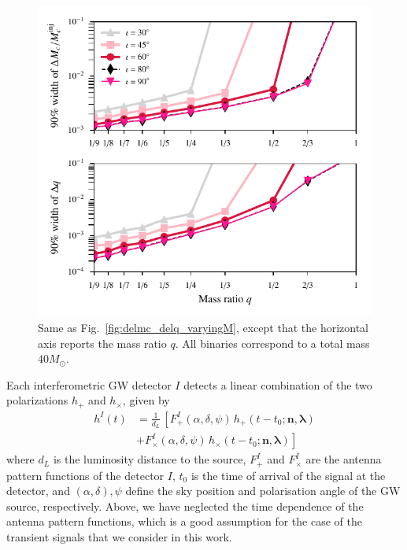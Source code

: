 \documentclass[prd,preprintnumbers,twocolumn,eqsecnum,floatfix,a4paper,nofootinbib,superscriptaddress]{revtex4}
\newcommand{\blambda}{\bm{\lambda}}
\newcommand{\n}{\mathbf{n}}
\begin{document}
 \begin{figure}[tbh]
 	\begin{center}
 		\includegraphics[scale=0.8]{figs/hm_9dim_dmcbymcinj_dq_diff_q.pdf}
 	\end{center} 
 	\caption{Same as Fig.~\ref{fig:delmc_delq_varyingM}, except that the horizontal axis reports the mass ratio $q$. All binaries correspond to a total mass $40M_{\odot}$.}
 	\label{fig:delmc_delq_varyingq}
 \end{figure}

Each interferometric GW detector $I$ detects a linear combination of the two polarizations $h_+$ and $h_\times$, given by 
\begin{eqnarray}
h^I(t) & = \frac{1}{d_L} \, \left [ F^I_+(\alpha, \delta, \psi) \, h_+(t-t_0; \n, \blambda) \right. \\ 
       & \left. + F^I_{\times}(\alpha, \delta, \psi)\, h_\times(t-t_0; \n, \blambda) \right]
\label{eq:det_response}
\end{eqnarray}
where ${d_L}$ is the luminosity distance to the source, $F^I_+$ and $F^I_\times$ are the antenna pattern functions of the detector $I$, $t_0$ is the time of arrival of the signal at the detector, and $(\alpha, \delta), \psi$ define the sky position and polarisation angle of the GW source, respectively. Above, we have neglected the time dependence of the antenna pattern functions, which is a good assumption for the case of the transient signals that we consider in this work. 
\end{document}

